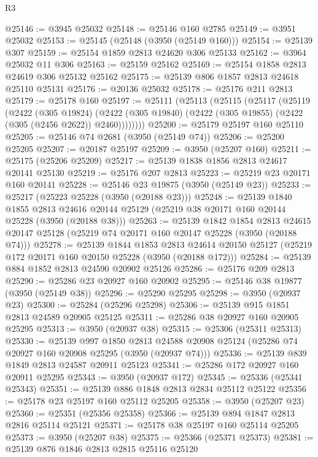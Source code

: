 \begin{lexlean}{R3}
\begin{coremodule}
@25146 := @3945 @25032
@25148 := @25146 @160 @2785
@25149 := @3951 @25032
@25153 := @25145 (@25148 (@3950 (@25149 @160)))
@25154 := @25139 @307
@25159 := @25154 @1859 @2813 @24620 @306 @25133
@25162 := @3964 @25032 @11 @306
@25163 := @25159 @25162
@25169 := @25154 @1858 @2813 @24619 @306 @25132 @25162
@25175 := @25139 @806 @1857 @2813 @24618 @25110 @25131
@25176 := @20136 @25032
@25178 := @25176 @211 @2813
@25179 := @25178 @160
@25197 := @25111
    (@25113
      (@25115
        (@25117
          (@25119
            (@2422
              (@305 @19824)
              (@2422 (@305 @19840) (@2422 (@305 @19855) (@2422 (@305 (@2456 @2622)) @2460))))))))
@25200 := @25179 @25197 @160 @25110
@25205 := @25146 @74 @2681 (@3950 (@25149 @74))
@25206 := @25200 @25205
@25207 := @20187 @25197
@25209 := @3950 (@25207 @160)
@25211 := @25175 (@25206 @25209)
@25217 := @25139 @1838 @1856 @2813 @24617 @20141 @25130
@25219 := @25176 @207 @2813
@25223 := @25219 @23 @20171 @160 @20141
@25228 := @25146 @23 @19875 (@3950 (@25149 @23))
@25233 := @25217 (@25223 @25228 (@3950 (@20188 @23)))
@25248 := @25139
    @1840
    @1855
    @2813
    @24616
    @20144
    @25129
    (@25219 @38 @20171 @160 @20144 @25228 (@3950 (@20188 @38)))
@25263 := @25139
    @1842
    @1854
    @2813
    @24615
    @20147
    @25128
    (@25219 @74 @20171 @160 @20147 @25228 (@3950 (@20188 @74)))
@25278 := @25139
    @1844
    @1853
    @2813
    @24614
    @20150
    @25127
    (@25219 @172 @20171 @160 @20150 @25228 (@3950 (@20188 @172)))
@25284 := @25139 @884 @1852 @2813 @24590 @20902 @25126
@25286 := @25176 @209 @2813
@25290 := @25286 @23 @20927 @160 @20902
@25295 := @25146 @38 @19877 (@3950 (@25149 @38))
@25296 := @25290 @25295
@25298 := @3950 (@20937 @23)
@25300 := @25284 (@25296 @25298)
@25306 := @25139 @915 @1851 @2813 @24589 @20905 @25125
@25311 := @25286 @38 @20927 @160 @20905 @25295
@25313 := @3950 (@20937 @38)
@25315 := @25306 (@25311 @25313)
@25330 := @25139
    @997
    @1850
    @2813
    @24588
    @20908
    @25124
    (@25286 @74 @20927 @160 @20908 @25295 (@3950 (@20937 @74)))
@25336 := @25139 @839 @1849 @2813 @24587 @20911 @25123
@25341 := @25286 @172 @20927 @160 @20911 @25295
@25343 := @3950 (@20937 @172)
@25345 := @25336 (@25341 @25343)
@25351 := @25139 @886 @1848 @2813 @2834 @25112 @25122
@25356 := @25178 @23 @25197 @160 @25112 @25205
@25358 := @3950 (@25207 @23)
@25360 := @25351 (@25356 @25358)
@25366 := @25139 @894 @1847 @2813 @2816 @25114 @25121
@25371 := @25178 @38 @25197 @160 @25114 @25205
@25373 := @3950 (@25207 @38)
@25375 := @25366 (@25371 @25373)
@25381 := @25139 @876 @1846 @2813 @2815 @25116 @25120

\end{coremodule}
\end{lexlean}

